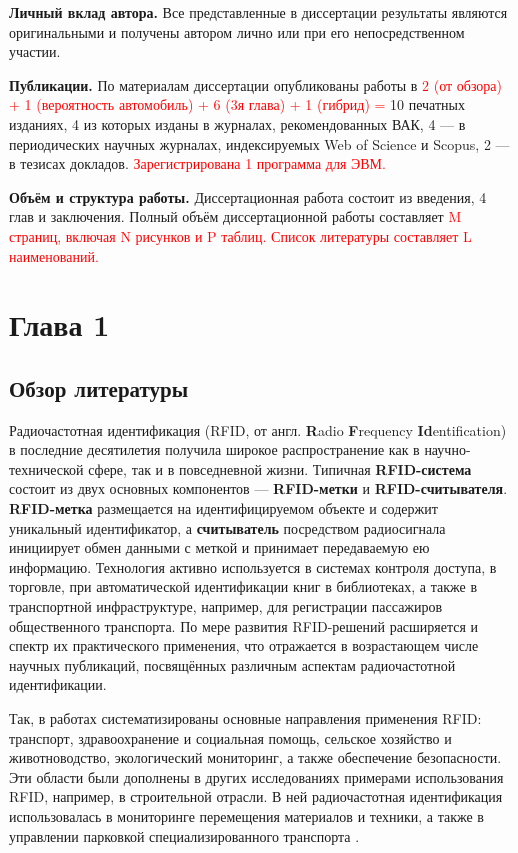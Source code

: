 \documentclass[12pt]{article}
\theoremstyle{definition}
\begin{document}
\textbf{Личный вклад автора.} Все представленные в диссертации результаты являются оригинальными и получены автором лично или при его непосредственном участии.

\textbf{Публикации.} По материалам диссертации опубликованы работы в \textcolor{red}{2 (от обзора) + 1 (вероятность автомобиль) + 6 (3я глава) + 1 (гибрид) =} 10 печатных изданиях, 4 из которых изданы в журналах, рекомендованных ВАК, 4 — в периодических научных журналах, индексируемых Web of Science и Scopus, 2 — в тезисах докладов. \textcolor{red}{Зарегистрирована 1 программа для ЭВМ.}

\textbf{Объём и структура работы.} Диссертационная работа состоит из введения, 4 глав и заключения. Полный объём диссертационной работы составляет \textcolor{red}{M страниц, включая N рисунков и P таблиц. Список литературы составляет L наименований.}


\pagebreak

\section{Глава 1}
\label{sec:ch1}

\subsection{Обзор литературы}
\label{sec:ch11}
Радиочастотная идентификация (RFID, от англ. \textbf{R}adio \textbf{F}requency \textbf{Id}entification) в последние десятилетия получила широкое распространение как в научно-технической сфере, так и в повседневной жизни. Типичная \textbf{RFID-система} состоит из двух основных компонентов — \textbf{RFID-метки} и \textbf{RFID-считывателя}. \textbf{RFID-метка} размещается на идентифицируемом объекте и содержит уникальный идентификатор, а \textbf{считыватель} посредством радиосигнала инициирует обмен данными с меткой и принимает передаваемую ею информацию. Технология активно используется в системах контроля доступа, в торговле, при автоматической идентификации книг в библиотеках, а также в транспортной инфраструктуре, например, для регистрации пассажиров общественного транспорта. По мере развития RFID-решений расширяется и спектр их практического применения, что отражается в возрастающем числе научных публикаций, посвящённых различным аспектам радиочастотной идентификации.

Так, в работах \cite{Jung2015, Kumar2023} систематизированы основные направления применения RFID: транспорт, здравоохранение и социальная помощь, сельское хозяйство и животноводство, экологический мониторинг, а также обеспечение безопасности. Эти области были дополнены в других исследованиях примерами использования RFID, например, в строительной отрасли. В ней радиочастотная идентификация использовалась в мониторинге перемещения материалов и техники, а также в управлении парковкой специализированного транспорта \cite{Sharma2020}.
\end{document}
